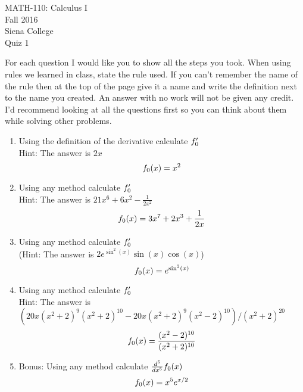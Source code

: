 \documentclass[11pt]{article}
\begin{document}
	\begin{center}
		MATH-110: Calculus I\\
		Fall 2016\\
		Siena College\\
		\vspace{.1in}
		Quiz 1
	\end{center}
	\vspace{.1in}
	
	For each question I would like you to show all the steps you took.  When using rules we learned in class, state the rule used.  If you can't remember the name of the rule then at the top of the page give it a name and write the definition next to the name you created.  An answer with no work will not be given any credit.\\
	
	I'd recommend looking at all the questions first so you can think about them while solving other problems.\\
	
	\newpage
	\begin{enumerate}
		\item  Using the definition of the derivative calculate $f'_{\number\value{enumi}}$\\
		Hint: The answer is $2x$ $$f_{\number\value{enumi}}(x) = x^2$$
		\newpage
		\item  Using any method calculate $f'_{\number\value{enumi}}$\\
		Hint: The answer is $21 x^6 + 6x^2 - \frac{1}{2 x^2}$ $$f_{\number\value{enumi}}(x) = 3 x^7 + 2 x^3 + \frac{1}{2 x}$$
		\newpage
		\item  Using any method calculate $f'_{\number\value{enumi}}$\\
		(Hint: The answer is $2 e^{\sin^2(x)} \sin(x)\cos(x)$) $$f_{\number\value{enumi}}(x) = e^{\sin^2(x)}$$
		\newpage
		\item  Using any method calculate $f'_{\number\value{enumi}}$\\
		Hint: The answer is\\ $(20 x (x^2 + 2)^9 (x^2 + 2)^{10} - 20 x (x^2 + 2)^9 (x^2 - 2)^{10})/(x^2 + 2)^{20}$
		$$f_{\number\value{enumi}}(x) = \frac{(x^2 - 2)^{10}}{(x^2 + 2)^{10}}$$
		\newpage
		\item  Bonus:  Using any method calculate $\frac{d^5}{dx^5}f_{\number\value{enumi}}(x)$\\
		$$f_{\number\value{enumi}}(x) = x^5 e^{x/2}$$
	\end{enumerate}
	
\end{document}
